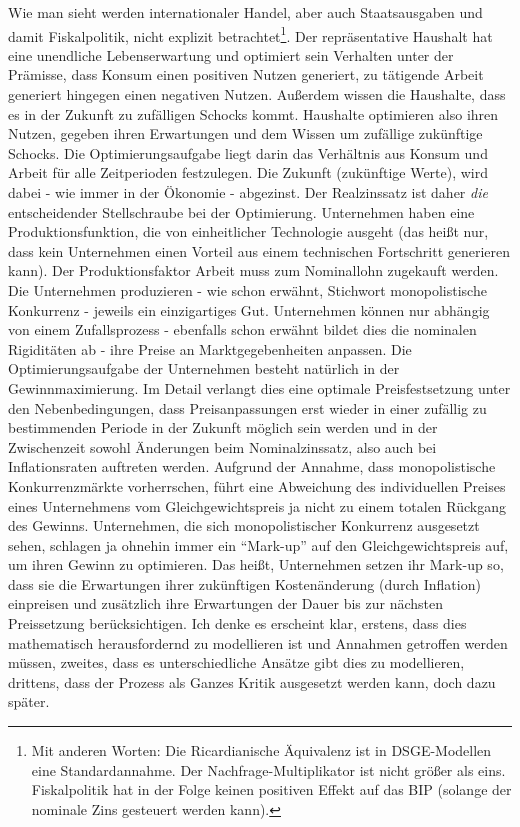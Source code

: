 Wie man sieht werden internationaler Handel, aber auch Staatsausgaben und damit Fiskalpolitik, nicht explizit betrachtet\footnote{Mit anderen Worten: Die Ricardianische Äquivalenz ist in DSGE-Modellen eine Standardannahme. Der Nachfrage-Multiplikator ist nicht größer als eins. Fiskalpolitik hat in der Folge keinen positiven Effekt auf das BIP (solange der nominale Zins gesteuert werden kann).}. Der repräsentative Haushalt hat eine unendliche Lebenserwartung und optimiert sein Verhalten unter der Prämisse, dass Konsum einen positiven Nutzen generiert, zu tätigende Arbeit generiert hingegen einen negativen Nutzen.  Außerdem wissen die Haushalte, dass es in der Zukunft zu zufälligen Schocks kommt. Haushalte optimieren also ihren Nutzen, gegeben ihren Erwartungen und dem Wissen um zufällige zukünftige Schocks. Die Optimierungsaufgabe liegt darin das Verhältnis aus Konsum und Arbeit für alle Zeitperioden festzulegen. Die Zukunft (zukünftige Werte), wird dabei - wie immer in der Ökonomie - abgezinst. Der Realzinssatz ist daher \textit{die} entscheidender Stellschraube bei der Optimierung.
Unternehmen haben eine Produktionsfunktion, die von einheitlicher Technologie ausgeht (das heißt nur, dass kein Unternehmen einen Vorteil aus einem technischen Fortschritt generieren kann). Der Produktionsfaktor Arbeit muss zum Nominallohn zugekauft werden. Die Unternehmen produzieren - wie schon erwähnt, Stichwort monopolistische Konkurrenz - jeweils ein einzigartiges Gut. Unternehmen können nur abhängig von einem Zufallsprozess - ebenfalls schon erwähnt bildet dies die nominalen Rigiditäten ab - ihre Preise an Marktgegebenheiten anpassen. Die Optimierungsaufgabe der Unternehmen besteht natürlich in der Gewinnmaximierung. Im Detail verlangt dies eine optimale Preisfestsetzung unter den Nebenbedingungen, dass Preisanpassungen erst wieder in einer zufällig zu bestimmenden Periode in der Zukunft möglich sein werden und in der Zwischenzeit sowohl Änderungen beim Nominalzinssatz, also auch bei Inflationsraten auftreten werden. Aufgrund der Annahme, dass monopolistische Konkurrenzmärkte vorherrschen, führt eine Abweichung des individuellen Preises eines Unternehmens vom Gleichgewichtspreis ja nicht zu einem totalen Rückgang des Gewinns. Unternehmen, die sich monopolistischer Konkurrenz ausgesetzt sehen, schlagen ja ohnehin immer ein "`Mark-up"' auf den Gleichgewichtspreis auf, um ihren Gewinn zu optimieren. Das heißt, Unternehmen setzen ihr Mark-up so, dass sie die Erwartungen ihrer zukünftigen Kostenänderung (durch Inflation) einpreisen und zusätzlich ihre Erwartungen der Dauer bis zur nächsten Preissetzung berücksichtigen. Ich denke es erscheint klar, erstens, dass dies mathematisch herausfordernd zu modellieren ist und Annahmen getroffen werden müssen, zweites, dass es unterschiedliche Ansätze gibt dies zu modellieren, drittens, dass der Prozess als Ganzes Kritik ausgesetzt werden kann, doch dazu später.
